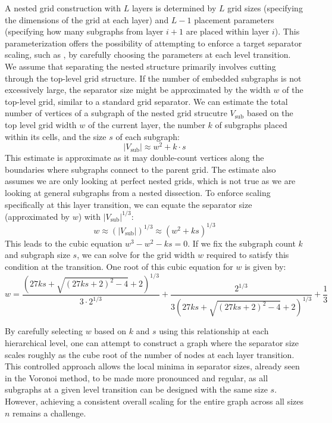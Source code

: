 A nested grid construction with \(L\) layers is determined by \(L\) grid sizes (specifying the dimensions of the grid at each layer) and \(L-1\) placement parameters (specifying how many subgraphs from layer \(i+1\) are placed within layer \(i\)).
This parameterization offers the possibility of attempting to enforce a target separator scaling, such as , by carefully choosing the parameters at each level transition.
We assume that separating the nested structure primarily involves cutting through the top-level grid structure.
If the number of embedded subgraphs is not excessively large, the separator size might be approximated by the width \(w\) of the top-level grid, similar to a standard grid separator.
We can estimate the total number of vertices of a subgraph of the nested grid strucutre \(V_\text{sub}\) based on the top level grid width \(w\) of the current layer, the number \(k\) of subgraphs placed within its cells, and the size \(s\) of each subgraph:
\[ |V_\text{sub}| \approx w^2 + k \cdot s \]
This estimate is approximate as it may double-count vertices along the boundaries where subgraphs connect to the parent grid.
The estimate also assumes we are only looking at perfect nested grids, which is not true as we are looking at general subgraphs from a nested dissection.
To enforce  scaling specifically at this layer transition, we can equate the separator size (approximated by \(w\)) with \(|V_\text{sub}|^{1/3}\):
\[ w \approx (|V_\text{sub}|)^{1/3} \approx (w^2 + ks)^{1/3} \]
This leads to the cubic equation \( w^3 - w^2 - ks = 0 \).
If we fix the subgraph count \(k\) and subgraph size \(s\), we can solve for the grid width \(w\) required to satisfy this condition at the transition.
One root of this cubic equation for \(w\) is given by:
\[ w = \frac{(27 k s + \sqrt{(27 k s + 2)^2 - 4} + 2)^{1/3}}{3 \cdot 2^{1/3}} + \frac{2^{1/3}}{3 (27 k s + \sqrt{(27 k s + 2)^2 - 4} + 2)^{1/3}} + \frac{1}{3} \]

By carefully selecting \(w\) based on \(k\) and \(s\) using this relationship at each hierarchical level, one can attempt to construct a graph where the separator size scales roughly as the cube root of the number of nodes at each layer transition.
This controlled approach allows the local minima in separator sizes, already seen in the Voronoi method, to be made more pronounced and regular, as all subgraphs at a given level transition can be designed with the same size \(s\).
However, achieving a consistent overall  scaling for the entire graph across all sizes \(n\) remains a challenge.

